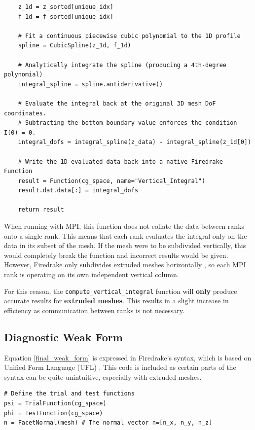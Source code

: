 \documentclass{article}
\begin{document}
\begin{appendices}
\begin{verbatim}
    z_1d = z_sorted[unique_idx]
    f_1d = f_sorted[unique_idx]

    # Fit a continuous piecewise cubic polynomial to the 1D profile
    spline = CubicSpline(z_1d, f_1d)

    # Analytically integrate the spline (producing a 4th-degree polynomial)
    integral_spline = spline.antiderivative()

    # Evaluate the integral back at the original 3D mesh DoF coordinates.
    # Subtracting the bottom boundary value enforces the condition I(0) = 0.
    integral_dofs = integral_spline(z_data) - integral_spline(z_1d[0])

    # Write the 1D evaluated data back into a native Firedrake Function
    result = Function(cg_space, name="Vertical_Integral")
    result.dat.data[:] = integral_dofs

    return result
\end{verbatim}

When running with MPI, this function does not collate the data between ranks onto a single rank.
This means that each rank evaluates the integral only on the data in its subset of the mesh.
If the mesh were to be subdivided vertically, this would completely break the function and
incorrect results would be given.
However, Firedrake only subdivides extruded meshes horizontally \cite{FiredrakeUserManual, LangeMitchellKnepleyGorman2015, PTSCOTCH}, so each MPI rank is operating on its own independent vertical column.

For this reason, the \texttt{compute_vertical_integral} function will \textbf{only} produce accurate results for \textbf{extruded meshes}.
This results in a slight increase in efficiency as communication between ranks is not necessary.

\subsection{Diagnostic Weak Form}\label{app:weak_form}

Equation \eqref{final_weak_form} is expressed in Firedrake's syntax, which is based on Unified Form Language (UFL) \cite{UFL}.
This code is included as certain parts of the syntax can be quite unintuitive, especially with extruded meshes.

\begin{verbatim}
# Define the trial and test functions
psi = TrialFunction(cg_space)
phi = TestFunction(cg_space)
n = FacetNormal(mesh) # The normal vector n=[n_x, n_y, n_z]


\end{verbatim}
\end{appendices}
\end{document}
